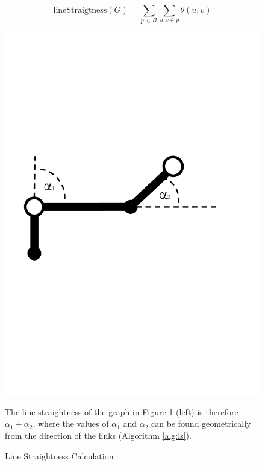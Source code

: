 \begin{equation}
	\text{lineStraigtness}(G) = \sum_{p\,\in{\Pi}}\sum_{u, v\in p} \theta(u, v)
\label{eqn:linestraightness}
\end{equation}

\begin{figure}[h]
\centering
\hspace{-0.5cm}\begin{minipage}{.5\textwidth}
  \centering\includegraphics[width=.8\linewidth]{img/implementation/linestraightness.pdf}\caption{Line Straightness Calculation\label{fig:linestraightness}}
  \end{minipage}\hspace{0.5cm}\begin{minipage}{.5\textwidth}
The line straightness of the graph in Figure \ref{fig:linestraightness} (left) is therefore $\alpha_1 + \alpha_2$, where the values of $\alpha_1$ and $\alpha_2$ can be found geometrically from the direction of the links (Algorithm \ref{alg:ls}).
\end{minipage}
\end{figure}

